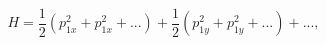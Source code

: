 \begin{equation}
   H =  \frac{1}{2} (p^2_{1x} +p^2_{1x}+ ...) + \frac{1}{2} (p^2_{1y} +p^2_{1y}+ ...) + ... ,  \label{l8}
   \end{equation}

